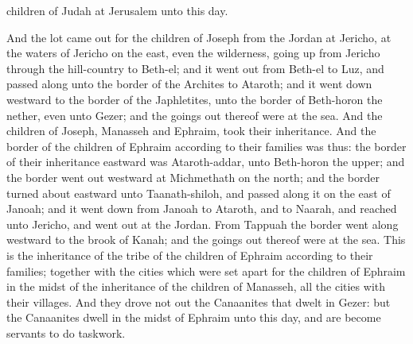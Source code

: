 children of Judah at Jerusalem unto this day. 

And the lot came out for the children of Joseph from the Jordan at Jericho, at the waters of Jericho on the east, even the wilderness, going up from Jericho through the hill-country to Beth-el; and it went out from Beth-el to Luz, and passed along unto the border of the Archites to Ataroth; and it went down westward to the border of the Japhletites, unto the border of Beth-horon the nether, even unto Gezer; and the goings out thereof were at the sea. And the children of Joseph, Manasseh and Ephraim, took their inheritance.  And the border of the children of Ephraim according to their families was thus: the border of their inheritance eastward was Ataroth-addar, unto Beth-horon the upper; and the border went out westward at Michmethath on the north; and the border turned about eastward unto Taanath-shiloh, and passed along it on the east of Janoah; and it went down from Janoah to Ataroth, and to Naarah, and reached unto Jericho, and went out at the Jordan. From Tappuah the border went along westward to the brook of Kanah; and the goings out thereof were at the sea. This is the inheritance of the tribe of the children of Ephraim according to their families; together with the cities which were set apart for the children of Ephraim in the midst of the inheritance of the children of Manasseh, all the cities with their villages. And they drove not out the Canaanites that dwelt in Gezer: but the Canaanites dwell in the midst of Ephraim unto this day, and are become servants to do taskwork. 

